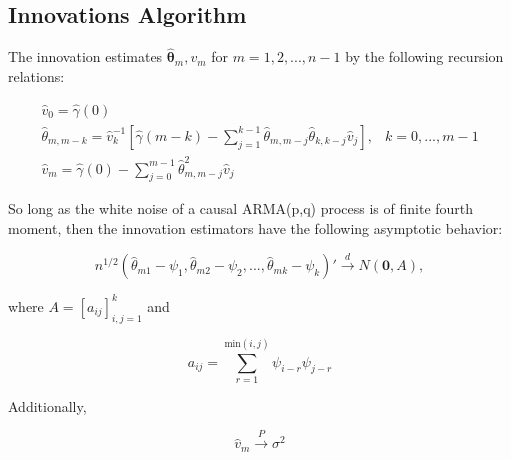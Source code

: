 \subsection{Innovations Algorithm}

The innovation estimates $\hat{\bm{\theta}}_m, v_m$ for $m = 1,2,...,n-1$ by the following recursion relations:

$$\begin{array}{cc}
    \hat{v}_0 = \hat{\gamma}(0) &  \\
    \hat{\theta}_{m,m-k} = \hat{v}_k^{-1}\left[ \hat{\gamma}(m-k) -\sum_{j=1}^{k-1}\hat{\theta}_{m,m-j} \hat{\theta}_{k,k-j}\hat{v}_j \right], & k = 0,...,m-1 \\
    \hat{v}_m = \hat{\gamma}(0)-\sum_{j=0}^{m-1}\hat{\theta}_{m,m-j}^2\hat{v}_j
\end{array}$$

So long as the white noise of a causal ARMA(p,q) process is of finite fourth moment, then the innovation estimators have the following asymptotic behavior:

$$ n^{1/2}(\hat{\theta}_{m1} - \psi_1, \hat{\theta}_{m2} - \psi_2,...,\hat{\theta}_{mk} - \psi_k)' \xrightarrow{d} N(\mathbf{0},A), $$


where $A = \left[a_{ij}\right]_{i,j=1}^k$ and

$$ a_{ij} = \sum_{r=1}^{\text{min}(i,j)}\psi_{i-r}\psi_{j-r} $$

Additionally,

$$ \hat{v}_m \xrightarrow{P}\sigma^2 $$